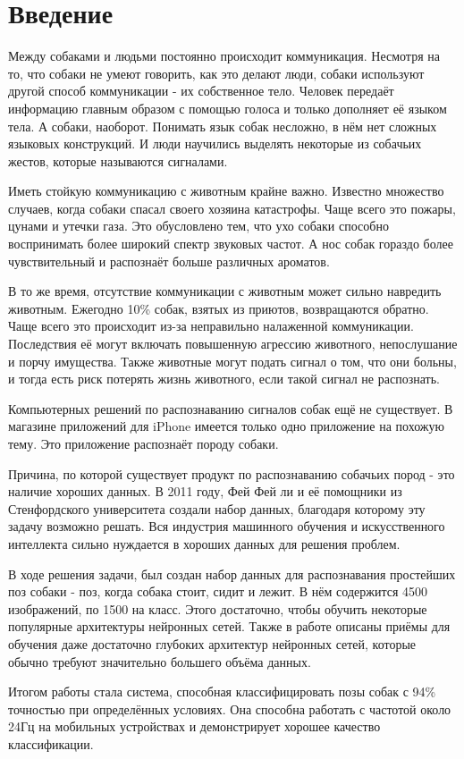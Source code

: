 \chapter*{Введение}							%

Между собаками и людьми постоянно происходит коммуникация. Несмотря на то, что собаки не умеют говорить, как это делают люди, собаки используют другой способ коммуникации - их собственное тело. Человек передаёт информацию главным образом с помощью голоса и только дополняет её языком тела. А собаки, наоборот. Понимать язык собак несложно, в нём нет сложных языковых конструкций. И люди научились выделять некоторые из собачьих жестов, которые называются сигналами. 

Иметь стойкую коммуникацию с животным крайне важно. Известно множество случаев, когда собаки спасал своего хозяина катастрофы. Чаще всего это пожары, цунами и утечки газа. Это обусловлено тем, что ухо собаки способно воспринимать более широкий спектр звуковых частот. А нос собак гораздо более чувствительный и распознаёт больше различных ароматов.

В то же время, отсутствие коммуникации с животным может сильно навредить животным. Ежегодно 10\% собак, взятых из приютов, возвращаются обратно. Чаще всего это происходит из-за неправильно налаженной коммуникации.\cite{reasons_dogs_return_to_shelters} Последствия её могут включать повышенную агрессию животного, непослушание и порчу имущества. Также животные могут подать сигнал о том, что они больны, и тогда есть риск потерять жизнь животного, если такой сигнал не распознать. 

Компьютерных решений по распознаванию сигналов собак ещё не существует. В магазине приложений для iPhone имеется только одно приложение на похожую тему. Это приложение распознаёт породу собаки. 

Причина, по которой существует продукт по распознаванию собачьих пород - это наличие хороших данных. В 2011 году, Фей Фей ли и её помощники из Стенфордского университета \cite{KhoslaYaoJayadevaprakashFeiFei_FGVC2011} создали набор данных, благодаря которому эту задачу возможно решать. Вся индустрия машинного обучения и искусственного интеллекта сильно нуждается в хороших данных для решения проблем.

В ходе решения задачи, был создан набор данных для распознавания простейших поз собаки - поз, когда собака стоит, сидит и лежит. В нём содержится 4500 изображений, по 1500 на класс. Этого достаточно, чтобы обучить некоторые популярные архитектуры нейронных сетей. Также в работе описаны приёмы для обучения даже достаточно глубоких архитектур нейронных сетей, которые обычно требуют значительно большего объёма данных.

Итогом работы стала система, способная классифицировать позы собак с 94\% точностью при определённых условиях. Она способна работать с частотой около 24Гц на мобильных устройствах и демонстрирует хорошее качество классификации.
